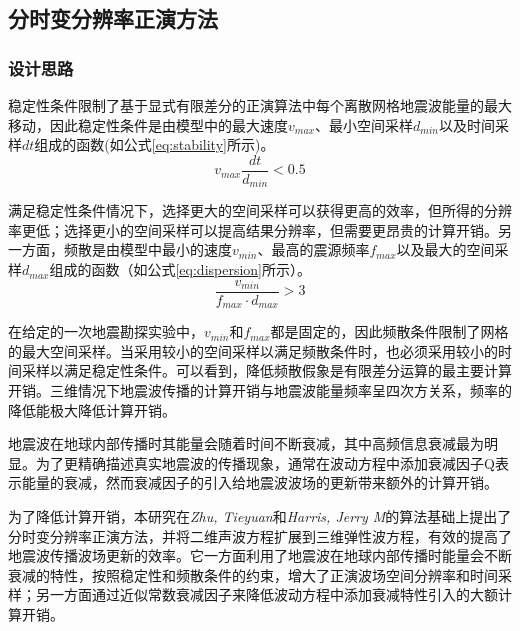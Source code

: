 
\subsection{分时变分辨率正演方法} %
\label{sec:分时变分辨率正演方法}

\subsubsection{设计思路}

稳定性条件限制了基于显式有限差分的正演算法中每个离散网格地震波能量的最大移动，因此稳定性条件是由模型中的最大速度$v_{max}$、最小空间采样$d_{min}$以及时间采样$dt$组成的函数(如公式\ref{eq:stability}所示)。
\begin{equation}
  v_{max} \frac{dt}{d_{min}} < 0.5
  \label{eq:stability}
\end{equation}

满足稳定性条件情况下，选择更大的空间采样可以获得更高的效率，但所得的分辨率更低；选择更小的空间采样可以提高结果分辨率，但需要更昂贵的计算开销。另一方面，频散是由模型中最小的速度$v_{min}$、最高的震源频率$f_{max}$以及最大的空间采样$d_{max}$组成的函数（如公式\ref{eq:dispersion}所示）。
\begin{equation}
  \frac{v_{min}}{f_{max}\cdot d_{max}} > 3
  \label{eq:dispersion}
\end{equation}

在给定的一次地震勘探实验中，$v_{min}$和$f_{max}$都是固定的，因此频散条件限制了网格的最大空间采样。当采用较小的空间采样以满足频散条件时，也必须采用较小的时间采样以满足稳定性条件。可以看到，降低频散假象是有限差分运算的最主要计算开销。三维情况下地震波传播的计算开销与地震波能量频率呈四次方关系，频率的降低能极大降低计算开销。

地震波在地球内部传播时其能量会随着时间不断衰减，其中高频信息衰减最为明显。为了更精确描述真实地震波的传播现象，通常在波动方程中添加衰减因子Q表示能量的衰减，然而衰减因子的引入给地震波波场的更新带来额外的计算开销。

为了降低计算开销，本研究在\emph{Zhu, Tieyuan}和\emph{Harris, Jerry M}\cite{zhu2014modeling}的算法基础上提出了分时变分辨率正演方法，并将二维声波方程扩展到三维弹性波方程，有效的提高了地震波传播波场更新的效率。它一方面利用了地震波在地球内部传播时能量会不断衰减的特性，按照稳定性和频散条件的约束，增大了正演波场空间分辨率和时间采样；另一方面通过近似常数衰减因子来降低波动方程中添加衰减特性引入的大额计算开销。

